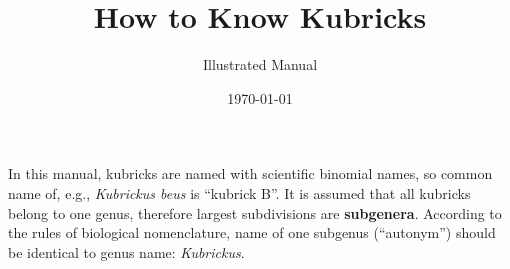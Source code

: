 \documentclass[12pt]{report} %
\title{How to Know Kubricks}
\author{Illustrated Manual}
\date{\today}
\begin{document}
\maketitle

\tableofcontents

\sloppy %

\vspace*{8ex}

In this manual, kubricks are named with scientific binomial names, so
common name of, e.g., \emph{Kubrickus beus} is ``kubrick B''. It is
assumed that all kubricks belong to one genus, therefore largest
subdivisions are \textbf{subgenera}. According to the rules of biological
nomenclature, name of one subgenus (``autonym'') should be identical to
genus name: \emph{Kubrickus}.


\end{document}
